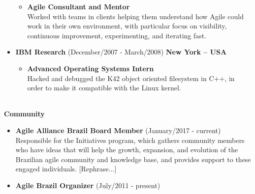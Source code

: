 \documentclass[a4paper, 10pt, onecolumn, oneside]{report}
\begin{document}
\begin{itemize}
{{\begin{itemize}
		\item{\textbf{Agile Consultant and Mentor}\\
			Worked with teams in clients helping them understand how Agile could work in their own environment, with particular focus on visibility, continuous improvement, experimenting, and iterating fast.
		}
	\end{itemize}
	}
}

\item{\textbf{IBM Research} (December/2007 - March/2008) \hfill \textbf{New York -- USA}
	\begin{itemize}
		\item{\textbf{Advanced Operating Systems Intern}\\
			Hacked and debugged the K42 object oriented filesystem in C++, in order to make it compatible with the Linux kernel.
		}
	\end{itemize}
}
\end{itemize}
\\
{\large\textbf{Community}} \hspace{0.5em}\hrulefill
\\
\begin{itemize}
\item{\textbf{Agile Alliance Brazil Board Member} (January/2017 - current)
	Responsible for the Initiatives program, which gathers community members who have ideas that will help the growth, expansion, and evolution of the Brazilian agile community and knowledge base, and provides support to these engaged individuals. [Rephrase...]
}

\item{\textbf{Agile Brazil Organizer} (July/2011 - present)\\
}
\end{itemize}
\end{document}
